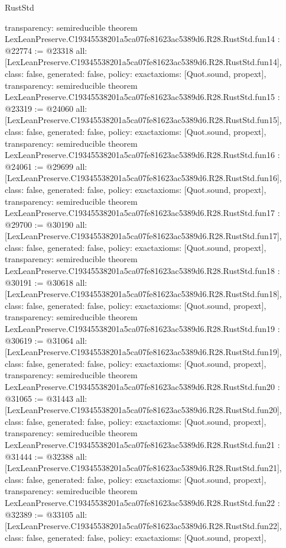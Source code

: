 \begin{lexlean}{RustStd}
\begin{coremodule}
{  transparency: semireducible
}
theorem LexLeanPreserve.C19345538201a5ca07fe81623ac5389d6.R28.RustStd.fun14 : @22774 := @23318 {
  all: [LexLeanPreserve.C19345538201a5ca07fe81623ac5389d6.R28.RustStd.fun14],
  class: false,
  generated: false,
  policy: exact{axioms: [Quot.sound, propext]},
  transparency: semireducible
}
theorem LexLeanPreserve.C19345538201a5ca07fe81623ac5389d6.R28.RustStd.fun15 : @23319 := @24060 {
  all: [LexLeanPreserve.C19345538201a5ca07fe81623ac5389d6.R28.RustStd.fun15],
  class: false,
  generated: false,
  policy: exact{axioms: [Quot.sound, propext]},
  transparency: semireducible
}
theorem LexLeanPreserve.C19345538201a5ca07fe81623ac5389d6.R28.RustStd.fun16 : @24061 := @29699 {
  all: [LexLeanPreserve.C19345538201a5ca07fe81623ac5389d6.R28.RustStd.fun16],
  class: false,
  generated: false,
  policy: exact{axioms: [Quot.sound, propext]},
  transparency: semireducible
}
theorem LexLeanPreserve.C19345538201a5ca07fe81623ac5389d6.R28.RustStd.fun17 : @29700 := @30190 {
  all: [LexLeanPreserve.C19345538201a5ca07fe81623ac5389d6.R28.RustStd.fun17],
  class: false,
  generated: false,
  policy: exact{axioms: [Quot.sound, propext]},
  transparency: semireducible
}
theorem LexLeanPreserve.C19345538201a5ca07fe81623ac5389d6.R28.RustStd.fun18 : @30191 := @30618 {
  all: [LexLeanPreserve.C19345538201a5ca07fe81623ac5389d6.R28.RustStd.fun18],
  class: false,
  generated: false,
  policy: exact{axioms: [Quot.sound, propext]},
  transparency: semireducible
}
theorem LexLeanPreserve.C19345538201a5ca07fe81623ac5389d6.R28.RustStd.fun19 : @30619 := @31064 {
  all: [LexLeanPreserve.C19345538201a5ca07fe81623ac5389d6.R28.RustStd.fun19],
  class: false,
  generated: false,
  policy: exact{axioms: [Quot.sound, propext]},
  transparency: semireducible
}
theorem LexLeanPreserve.C19345538201a5ca07fe81623ac5389d6.R28.RustStd.fun20 : @31065 := @31443 {
  all: [LexLeanPreserve.C19345538201a5ca07fe81623ac5389d6.R28.RustStd.fun20],
  class: false,
  generated: false,
  policy: exact{axioms: [Quot.sound, propext]},
  transparency: semireducible
}
theorem LexLeanPreserve.C19345538201a5ca07fe81623ac5389d6.R28.RustStd.fun21 : @31444 := @32388 {
  all: [LexLeanPreserve.C19345538201a5ca07fe81623ac5389d6.R28.RustStd.fun21],
  class: false,
  generated: false,
  policy: exact{axioms: [Quot.sound, propext]},
  transparency: semireducible
}
theorem LexLeanPreserve.C19345538201a5ca07fe81623ac5389d6.R28.RustStd.fun22 : @32389 := @33105 {
  all: [LexLeanPreserve.C19345538201a5ca07fe81623ac5389d6.R28.RustStd.fun22],
  class: false,
  generated: false,
  policy: exact{axioms: [Quot.sound, propext]},
}
\end{coremodule}
\end{lexlean}
